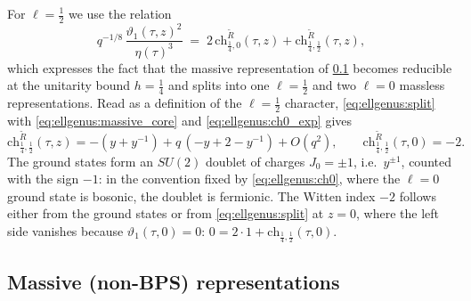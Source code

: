 For $\ell=\tfrac12$ we use the relation 
\begin{equation}\label{eq:ellgenus:split}
 q^{-1/8}\,\frac{\vartheta_1(\tau,z)^2}{\eta(\tau)^3}
 \;=\;2\,\mathrm{ch}^{\tilde R}_{\frac14,0}(\tau,z)+\mathrm{ch}^{\tilde R}_{\frac14,\frac12}(\tau,z),
\end{equation}
which expresses the fact that the massive representation of \cref{sec:ellgenus:massive}
becomes reducible at the unitarity bound $h=\tfrac14$ and splits into one $\ell=\tfrac12$
and two $\ell=0$ massless representations. Read as a definition of the $\ell=\tfrac12$
character, \eqref{eq:ellgenus:split} with \eqref{eq:ellgenus:massive_core} and
\eqref{eq:ellgenus:ch0_exp} gives
\begin{equation}\label{eq:ellgenus:chhalf_exp}
 \mathrm{ch}^{\tilde R}_{\frac14,\frac12}(\tau,z)=-(y+y^{-1})+q\,(-y+2-y^{-1})+O(q^2),
 \qquad \mathrm{ch}^{\tilde R}_{\frac14,\frac12}(\tau,0)=-2 .
\end{equation}
The ground states form an $SU(2)$ doublet of charges $J_0=\pm1$, i.e.\ $y^{\pm1}$, counted
with the sign $-1$: in the convention fixed by \eqref{eq:ellgenus:ch0}, where the $\ell=0$
ground state is bosonic, the doublet is fermionic. The Witten index $-2$ follows either from
the ground states or from \eqref{eq:ellgenus:split} at $z=0$, where the left side vanishes
because $\vartheta_1(\tau,0)=0$: $0=2\cdot1+\mathrm{ch}_{\frac14,\frac12}(\tau,0)$.

\subsection{Massive (non-BPS) representations}\label{sec:ellgenus:massive}

